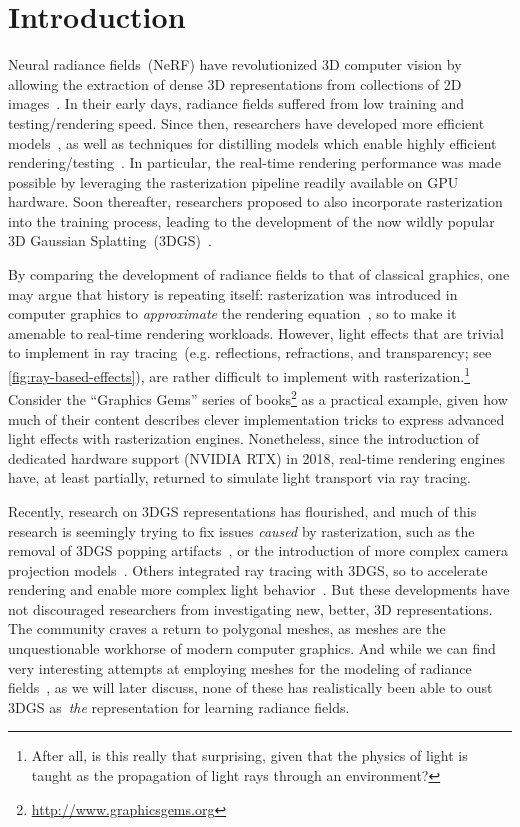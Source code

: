 



\section{Introduction}
\label{sec:intro}
% 
Neural radiance fields~(NeRF) have revolutionized 3D computer vision by allowing the extraction of dense 3D representations from collections of 2D images~\cite{nerf}.
In their early days, radiance fields suffered from low training and testing/rendering speed.
Since then, researchers have developed more efficient models~\cite{ingp}, as well as techniques for distilling models which enable highly efficient rendering/testing~\cite{mobilenerf}.
In particular, the real-time rendering performance was made possible by leveraging the rasterization pipeline readily available on GPU hardware.
Soon thereafter, researchers proposed to also incorporate rasterization into the training process, leading to the development of the now wildly popular 3D Gaussian Splatting~(3DGS)~\cite{gsplat}.


By comparing the development of radiance fields to that of classical graphics, one may argue that history is repeating itself: rasterization was introduced in computer graphics to \textit{approximate} the rendering equation~\cite{kajiya}, so to make it amenable to real-time rendering workloads.
However, light effects that are trivial to implement in ray tracing~(e.g. reflections,  refractions, and transparency; see \cref{fig:ray-based-effects}), are rather difficult to implement with rasterization.\footnote{After all, is this really that surprising, given that the physics of light is taught as the propagation of light rays through an environment?}
Consider the ``Graphics Gems'' series of books\footnote{\url{http://www.graphicsgems.org}} as a practical example, given how much of their content describes clever implementation tricks to express advanced light effects with rasterization engines.
Nonetheless, since the introduction of dedicated hardware support (NVIDIA RTX) in 2018, real-time rendering engines have, at least partially, returned to simulate light transport via ray tracing.

Recently, research on 3DGS representations has flourished, and much of this research is seemingly trying to fix issues \textit{caused} by rasterization, such as the removal of 3DGS popping artifacts~\cite{stopthepop}, or the introduction of more complex camera projection models~\cite{spherical3dgs}.
Others integrated ray tracing with 3DGS, so to accelerate rendering and enable more complex light behavior~\cite{3dgrt}.
But these developments have not discouraged researchers from investigating new, better, 3D representations.
The community craves a return to polygonal meshes, as meshes are the unquestionable workhorse of modern computer graphics.
And while we can find very interesting attempts at employing meshes for the modeling of radiance fields~\cite{tetrasplat, dmtet, tetranerf}, as we will later discuss, none of these has realistically been able to oust 3DGS as~\textit{the} representation for learning radiance fields.


